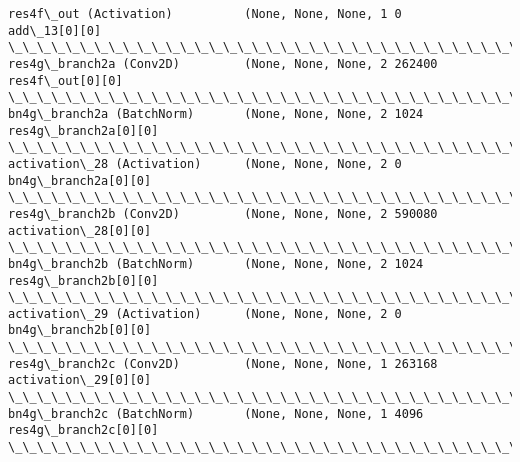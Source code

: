 \documentclass[11pt]{article}
\begin{document}
\begin{Verbatim}[commandchars=\\\{\}]
res4f\_out (Activation)          (None, None, None, 1 0           add\_13[0][0]                     
\_\_\_\_\_\_\_\_\_\_\_\_\_\_\_\_\_\_\_\_\_\_\_\_\_\_\_\_\_\_\_\_\_\_\_\_\_\_\_\_\_\_\_\_\_\_\_\_\_\_\_\_\_\_\_\_\_\_\_\_\_\_\_\_\_\_\_\_\_\_\_\_\_\_\_\_\_\_\_\_\_\_\_\_\_\_\_\_\_\_\_\_\_\_\_\_\_\_
res4g\_branch2a (Conv2D)         (None, None, None, 2 262400      res4f\_out[0][0]                  
\_\_\_\_\_\_\_\_\_\_\_\_\_\_\_\_\_\_\_\_\_\_\_\_\_\_\_\_\_\_\_\_\_\_\_\_\_\_\_\_\_\_\_\_\_\_\_\_\_\_\_\_\_\_\_\_\_\_\_\_\_\_\_\_\_\_\_\_\_\_\_\_\_\_\_\_\_\_\_\_\_\_\_\_\_\_\_\_\_\_\_\_\_\_\_\_\_\_
bn4g\_branch2a (BatchNorm)       (None, None, None, 2 1024        res4g\_branch2a[0][0]             
\_\_\_\_\_\_\_\_\_\_\_\_\_\_\_\_\_\_\_\_\_\_\_\_\_\_\_\_\_\_\_\_\_\_\_\_\_\_\_\_\_\_\_\_\_\_\_\_\_\_\_\_\_\_\_\_\_\_\_\_\_\_\_\_\_\_\_\_\_\_\_\_\_\_\_\_\_\_\_\_\_\_\_\_\_\_\_\_\_\_\_\_\_\_\_\_\_\_
activation\_28 (Activation)      (None, None, None, 2 0           bn4g\_branch2a[0][0]              
\_\_\_\_\_\_\_\_\_\_\_\_\_\_\_\_\_\_\_\_\_\_\_\_\_\_\_\_\_\_\_\_\_\_\_\_\_\_\_\_\_\_\_\_\_\_\_\_\_\_\_\_\_\_\_\_\_\_\_\_\_\_\_\_\_\_\_\_\_\_\_\_\_\_\_\_\_\_\_\_\_\_\_\_\_\_\_\_\_\_\_\_\_\_\_\_\_\_
res4g\_branch2b (Conv2D)         (None, None, None, 2 590080      activation\_28[0][0]              
\_\_\_\_\_\_\_\_\_\_\_\_\_\_\_\_\_\_\_\_\_\_\_\_\_\_\_\_\_\_\_\_\_\_\_\_\_\_\_\_\_\_\_\_\_\_\_\_\_\_\_\_\_\_\_\_\_\_\_\_\_\_\_\_\_\_\_\_\_\_\_\_\_\_\_\_\_\_\_\_\_\_\_\_\_\_\_\_\_\_\_\_\_\_\_\_\_\_
bn4g\_branch2b (BatchNorm)       (None, None, None, 2 1024        res4g\_branch2b[0][0]             
\_\_\_\_\_\_\_\_\_\_\_\_\_\_\_\_\_\_\_\_\_\_\_\_\_\_\_\_\_\_\_\_\_\_\_\_\_\_\_\_\_\_\_\_\_\_\_\_\_\_\_\_\_\_\_\_\_\_\_\_\_\_\_\_\_\_\_\_\_\_\_\_\_\_\_\_\_\_\_\_\_\_\_\_\_\_\_\_\_\_\_\_\_\_\_\_\_\_
activation\_29 (Activation)      (None, None, None, 2 0           bn4g\_branch2b[0][0]              
\_\_\_\_\_\_\_\_\_\_\_\_\_\_\_\_\_\_\_\_\_\_\_\_\_\_\_\_\_\_\_\_\_\_\_\_\_\_\_\_\_\_\_\_\_\_\_\_\_\_\_\_\_\_\_\_\_\_\_\_\_\_\_\_\_\_\_\_\_\_\_\_\_\_\_\_\_\_\_\_\_\_\_\_\_\_\_\_\_\_\_\_\_\_\_\_\_\_
res4g\_branch2c (Conv2D)         (None, None, None, 1 263168      activation\_29[0][0]              
\_\_\_\_\_\_\_\_\_\_\_\_\_\_\_\_\_\_\_\_\_\_\_\_\_\_\_\_\_\_\_\_\_\_\_\_\_\_\_\_\_\_\_\_\_\_\_\_\_\_\_\_\_\_\_\_\_\_\_\_\_\_\_\_\_\_\_\_\_\_\_\_\_\_\_\_\_\_\_\_\_\_\_\_\_\_\_\_\_\_\_\_\_\_\_\_\_\_
bn4g\_branch2c (BatchNorm)       (None, None, None, 1 4096        res4g\_branch2c[0][0]             
\_\_\_\_\_\_\_\_\_\_\_\_\_\_\_\_\_\_\_\_\_\_\_\_\_\_\_\_\_\_\_\_\_\_\_\_\_\_\_\_\_\_\_\_\_\_\_\_\_\_\_\_\_\_\_\_\_\_\_\_\_\_\_\_\_\_\_\_\_\_\_\_\_\_\_\_\_\_\_\_\_\_\_\_\_\_\_\_\_\_\_\_\_\_\_\_\_\_

\end{Verbatim}
\end{document}
